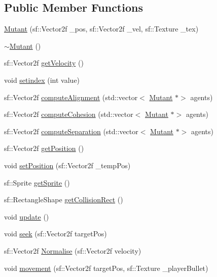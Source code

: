 \subsection*{Public Member Functions}
\begin{DoxyCompactItemize}
\item 
\hyperlink{class_mutant_acbc96ca2187e5266adf4fdaca228eeb0}{Mutant} (sf\+::\+Vector2f \+\_\+pos, sf\+::\+Vector2f \+\_\+vel, sf\+::\+Texture \+\_\+tex)
\item 
\hyperlink{class_mutant_a03dc2cf4d08ea08bea6cd4ded784dfc1}{$\sim$\+Mutant} ()
\item 
sf\+::\+Vector2f \hyperlink{class_mutant_a7455d81b54b869ac1f466bfc08c44ebb}{get\+Velocity} ()
\item 
void \hyperlink{class_mutant_a66e452c4f98ebaed704b29127403d3d9}{setindex} (int value)
\item 
sf\+::\+Vector2f \hyperlink{class_mutant_a1c6dbda519e0d1fa4013478f0337ed96}{compute\+Alignment} (std\+::vector$<$ \hyperlink{class_mutant}{Mutant} $\ast$$>$ agents)
\item 
sf\+::\+Vector2f \hyperlink{class_mutant_ab6daf2a25a5a96ccc672ef00d3aa90d4}{compute\+Cohesion} (std\+::vector$<$ \hyperlink{class_mutant}{Mutant} $\ast$$>$ agents)
\item 
sf\+::\+Vector2f \hyperlink{class_mutant_a3477994ce821511033006866f2f3b987}{compute\+Separation} (std\+::vector$<$ \hyperlink{class_mutant}{Mutant} $\ast$$>$ agents)
\item 
sf\+::\+Vector2f \hyperlink{class_mutant_ab20f22800bae3c7587beb641248412ac}{get\+Position} ()
\item 
void \hyperlink{class_mutant_af815ec529e98bf10daa9ac346c87f4d0}{set\+Position} (sf\+::\+Vector2f \+\_\+temp\+Pos)
\item 
sf\+::\+Sprite \hyperlink{class_mutant_a16d41479b4fabb6efef0a1af6a2df6ff}{get\+Sprite} ()
\item 
sf\+::\+Rectangle\+Shape \hyperlink{class_mutant_ada703f83af37442914832a08333dab26}{get\+Collision\+Rect} ()
\item 
void \hyperlink{class_mutant_af76cac0ad55dd2d515736f76cf693f40}{update} ()
\item 
void \hyperlink{class_mutant_a24699eb054b6cf95f66bf3e856364b71}{seek} (sf\+::\+Vector2f target\+Pos)
\item 
sf\+::\+Vector2f \hyperlink{class_mutant_a167cab6fa9c2a19f40c9886f043c1270}{Normalise} (sf\+::\+Vector2f velocity)
\item 
void \hyperlink{class_mutant_a95c362ea2f31919f63047b872cfdaf20}{movement} (sf\+::\+Vector2f target\+Pos, sf\+::\+Texture \+\_\+player\+Bullet)
$$
\end{DoxyCompactItemize}
